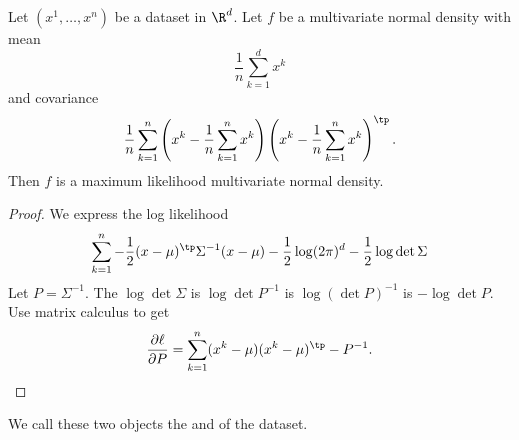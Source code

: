\begin{prop}
Let $(x^1, \dots, x^n)$ be a dataset in $\R^d$.
Let $f$ be a multivariate normal density with
mean
\[
  \frac{1}{n} \sum_{k = 1}^{d} x^k
\]
and covariance
\[
  \frac{1}{n}
  \sum_{k = 1}^{n}
  \left(x^k - \frac{1}{n} \sum_{k = 1}^{n} x^k\right)
  \left(x^k - \frac{1}{n} \sum_{k = 1}^{n} x^k\right)^\tp
  .
\]
Then $f$ is a maximum likelihood multivariate normal
density.
\begin{proof}
  We express the log likelihood
  \[
    \sum_{k = 1}^{n} -\frac{1}{2}(x - \mu)^\tp \Sigma^{-1} (x-\mu) - \frac{1}{2}\log (2\pi)^d - \frac{1}{2} \log \det \Sigma
  \]
  Let $P = \Sigma^{-1}$. The $\log\det \Sigma$ is $\log\det P^{-1}$ is $\log \left(\det P\right)^{-1}$ is $- \log\det P$.
  Use matrix calculus to get
  \[
    \frac{\partial \ell}{\partial P} = \sum_{k = 1}^{n} (x^k - \mu)(x^k - \mu)^\tp - P^{-1}.
  \]
\end{proof}
\end{prop}
We call these two objects
the 
and 
of the dataset.
\strats
